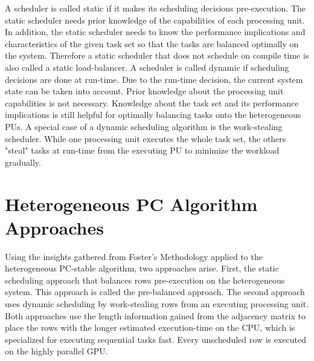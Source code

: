 A scheduler is called static if it makes its scheduling decisions pre-execution. The static scheduler needs prior knowledge of the capabilities of each processing unit. In addition, the static scheduler needs to know the performance implications and characteristics of the given task set so that the tasks are balanced optimally on the system. Therefore a static scheduler that does not schedule on compile time is also called a static load-balancer.
A scheduler is called dynamic if scheduling decisions are done at run-time. Due to the run-time decision, the current system state can be taken into account. Prior knowledge about the processing unit capabilities is not necessary. Knowledge about the task set and its performance implications is still helpful for optimally balancing tasks onto the heterogeneous PUs.
A special case of a dynamic scheduling algorithm is the work-stealing scheduler. While one processing unit executes the whole task set, the others "steal" tasks at run-time from the executing PU to minimize the workload gradually.

\section{Heterogeneous PC Algorithm Approaches}
Using the insights gathered from Foster's Methodology applied to the heterogeneous PC-stable algorithm, two approaches arise. First, the static scheduling approach that balances rows pre-execution on the heterogeneous system. This approach is called the pre-balanced approach. The second approach uses dynamic scheduling by work-stealing rows from an executing processing unit. Both approaches use the length information gained from the adjacency matrix to place the rows with the longer estimated execution-time on the CPU, which is specialized for executing sequential tasks fast. Every unscheduled row is executed on the highly parallel GPU.


